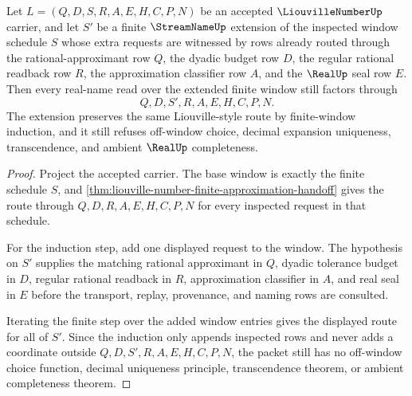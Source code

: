 \begin{theorem}
\label{thm:liouville-number-finite-window-approximation-induction}
Let $L=(Q,D,S,R,A,E,H,C,P,N)$ be an accepted $\LiouvilleNumberUp$ carrier, and let $S'$ be a finite $\StreamNameUp$ extension of the inspected window schedule $S$ whose extra requests are witnessed by rows already routed through the rational-approximant row $Q$, the dyadic budget row $D$, the regular rational readback row $R$, the approximation classifier row $A$, and the $\RealUp$ seal row $E$. Then every real-name read over the extended finite window still factors through
$$
Q,D,S',R,A,E,H,C,P,N.
$$
The extension preserves the same Liouville-style route by finite-window induction, and it still refuses off-window choice, decimal expansion uniqueness, transcendence, and ambient $\RealUp$ completeness.
\end{theorem}
\begin{proof}
Project the accepted carrier. The base window is exactly the finite schedule $S$, and \autoref{thm:liouville-number-finite-approximation-handoff} gives the route through $Q,D,R,A,E,H,C,P,N$ for every inspected request in that schedule.

For the induction step, add one displayed request to the window. The hypothesis on $S'$ supplies the matching rational approximant in $Q$, dyadic tolerance budget in $D$, regular rational readback in $R$, approximation classifier in $A$, and real seal in $E$ before the transport, replay, provenance, and naming rows are consulted.

Iterating the finite step over the added window entries gives the displayed route for all of $S'$. Since the induction only appends inspected rows and never adds a coordinate outside $Q,D,S',R,A,E,H,C,P,N$, the packet still has no off-window choice function, decimal uniqueness principle, transcendence theorem, or ambient completeness theorem.
\end{proof}


